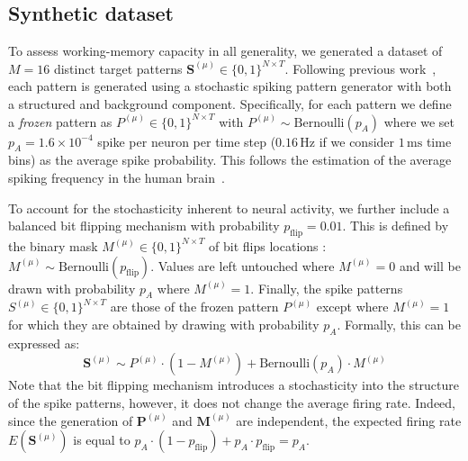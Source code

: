 \documentclass{scrartcl}
\newcommand{\citep}[1]{\parencite{#1}}
\begin{document}
\subsection{Synthetic dataset}
To assess working-memory capacity in all generality, we generated a dataset of $M = 16$ distinct target patterns $\mathbf{S}^{(\mu)} \in \{0,1\}^{N \times T}$. Following previous work~\citep{Perrinet2023}, each pattern is generated using a stochastic spiking pattern generator with both a structured and background component. Specifically, for each pattern we define a \emph{frozen} pattern as $P^{(\mu)} \in \{0,1\}^{N \times T}$ with $
  P^{(\mu)} \sim \mathrm{Bernoulli}(p_A)$ 
where we set $p_A = 1.6 \times 10^{-4}$ spike per neuron per time step ($0.16\,\mathrm{Hz}$ if we consider $1\,\mathrm{ms}$ time bins) as the average spike probability. This follows the estimation of the average spiking frequency in the human brain~\citep{Lennie2003}. 

To account for the stochasticity inherent to neural activity, we further include a balanced bit flipping mechanism with probability $p_\text{flip} = 0.01$. This is defined by the binary mask  $M^{(\mu)} \in \{0,1\}^{N \times T}$ of bit flips locations :
$
  M^{(\mu)} \sim \mathrm{Bernoulli}(p_\text{flip})
  $.
Values are left untouched where $M^{(\mu)} = 0$ and will be drawn with probability $p_A$ where $M^{(\mu)} = 1$. Finally, the spike patterns $S^{(\mu)} \in \{0,1\}^{N \times T}$ are those of the frozen pattern $P^{(\mu)}$ except where $M^{(\mu)} = 1$ for which they are obtained by drawing with probability $p_A$. Formally, this can be expressed as:
\begin{equation}
  \mathbf{S}^{(\mu)} \sim P^{(\mu)} \cdot (1 - M^{(\mu)}) + \mathrm{Bernoulli}(p_A) \cdot M^{(\mu)}
  \label{eq:pattern_generation}
\end{equation}
Note that the bit flipping mechanism introduces a stochasticity into the structure of the spike patterns, however, it does not change the average firing rate. Indeed, since the generation of $\mathbf{P}^{(\mu)}$ and $\mathbf{M}^{(\mu)}$ are independent, the expected firing rate $E(\mathbf{S}^{(\mu)})$ is equal to $p_A \cdot (1 - p_\text{flip}) + p_A \cdot p_\text{flip}= p_A$. 
%
\end{document}
